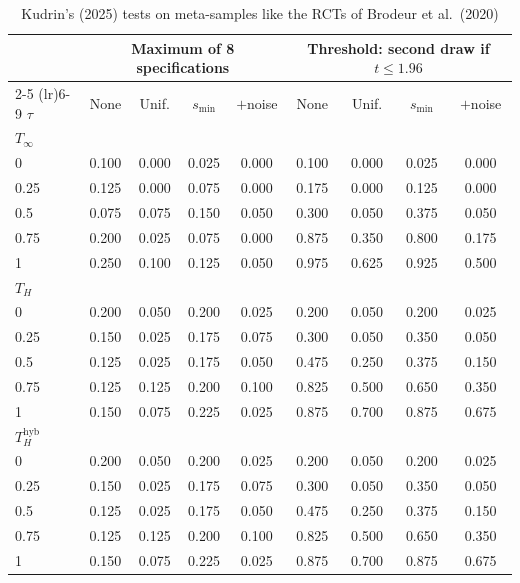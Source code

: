 \begin{table}[htbp]
\centering
\caption{Kudrin's (2025) tests on meta-samples like the RCTs of Brodeur et al.\ (2020)}
\label{tab:brodeur_rct_power_kudrin}
\footnotesize
\setlength{\tabcolsep}{4pt}
\begin{tabular}{lcccccccc}
\toprule
 & \multicolumn{4}{c}{Maximum of 8 specifications} & \multicolumn{4}{c}{Threshold: second draw if $t \le 1.96$} \\
\cmidrule(lr){2-5} \cmidrule(lr){6-9}
$\tau$ & None & Unif. & $s_{\min}$ & $+$noise & None & Unif. & $s_{\min}$ & $+$noise \\
\midrule
\multicolumn{9}{l}{\textit{$T_\infty$}} \\
0 & 0.100 & 0.000 & 0.025 & 0.000 & 0.100 & 0.000 & 0.025 & 0.000 \\
0.25 & 0.125 & 0.000 & 0.075 & 0.000 & 0.175 & 0.000 & 0.125 & 0.000 \\
0.5 & 0.075 & 0.075 & 0.150 & 0.050 & 0.300 & 0.050 & 0.375 & 0.050 \\
0.75 & 0.200 & 0.025 & 0.075 & 0.000 & 0.875 & 0.350 & 0.800 & 0.175 \\
1 & 0.250 & 0.100 & 0.125 & 0.050 & 0.975 & 0.625 & 0.925 & 0.500 \\
\midrule
\multicolumn{9}{l}{\textit{$T_H$}} \\
0 & 0.200 & 0.050 & 0.200 & 0.025 & 0.200 & 0.050 & 0.200 & 0.025 \\
0.25 & 0.150 & 0.025 & 0.175 & 0.075 & 0.300 & 0.050 & 0.350 & 0.050 \\
0.5 & 0.125 & 0.025 & 0.175 & 0.050 & 0.475 & 0.250 & 0.375 & 0.150 \\
0.75 & 0.125 & 0.125 & 0.200 & 0.100 & 0.825 & 0.500 & 0.650 & 0.350 \\
1 & 0.150 & 0.075 & 0.225 & 0.025 & 0.875 & 0.700 & 0.875 & 0.675 \\
\midrule
\multicolumn{9}{l}{\textit{$T_H^{\mathrm{hyb}}$}} \\
0 & 0.200 & 0.050 & 0.200 & 0.025 & 0.200 & 0.050 & 0.200 & 0.025 \\
0.25 & 0.150 & 0.025 & 0.175 & 0.075 & 0.300 & 0.050 & 0.350 & 0.050 \\
0.5 & 0.125 & 0.025 & 0.175 & 0.050 & 0.475 & 0.250 & 0.375 & 0.150 \\
0.75 & 0.125 & 0.125 & 0.200 & 0.100 & 0.825 & 0.500 & 0.650 & 0.350 \\
1 & 0.150 & 0.075 & 0.225 & 0.025 & 0.875 & 0.700 & 0.875 & 0.675 \\
\bottomrule
\end{tabular}

\end{table}
